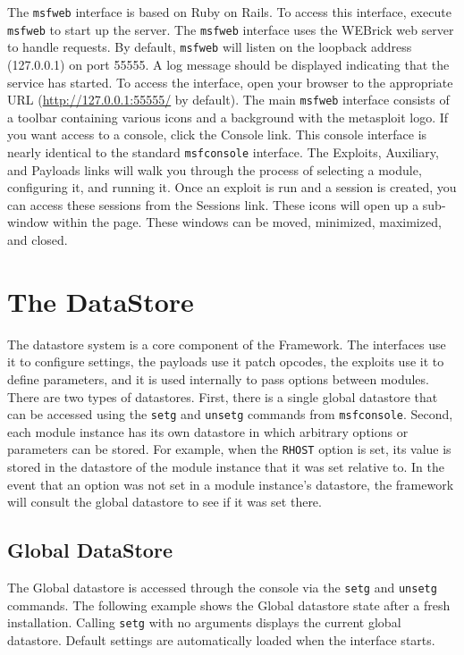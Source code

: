 \documentclass{report}
\begin{document}
\par
The \texttt{msfweb} interface is based on Ruby on Rails. To access this interface,
execute \texttt{msfweb} to start up the server. The \texttt{msfweb}
interface uses the WEBrick web server to handle requests. By default, \texttt{msfweb} will listen
on the loopback address (127.0.0.1) on port 55555. A log message should be displayed indicating that
the service has started. To access the interface, open your browser to the appropriate URL 
(\url{http://127.0.0.1:55555/} by default). The main \texttt{msfweb} interface consists of a toolbar
containing various icons and a background with the metasploit logo. If you want access to a console, 
click the Console link. This console interface is nearly identical to the standard 
\texttt{msfconsole} interface. The Exploits, Auxiliary, and Payloads links will walk you through 
the process of selecting a module, configuring it, and running it. Once an exploit is run and
a session is created, you can access these sessions from the Sessions link. These icons will open up
a sub-window within the page. These windows can be moved, minimized, maximized, and closed.

\pagebreak
\chapter{The DataStore}

\par
The datastore system is a core component of the Framework.  The interfaces use
it to configure settings, the payloads use it patch opcodes, the exploits
use it to define parameters, and it is used internally to pass options between
modules.  There are two types of datastores.  First, there is a single global
datastore that can be accessed using the \texttt{setg} and \texttt{unsetg}
commands from \texttt{msfconsole}.  Second, each module instance has its own
datastore in which arbitrary options or parameters can be stored.  For
example, when the \texttt{RHOST} option is set, its value is stored in the
datastore of the module instance that it was set relative to.  In the event
that an option was not set in a module instance's datastore, the framework
will consult the global datastore to see if it was set there.

    \section{Global DataStore}
    \label{ENV-GLOBAL}
\par
The Global datastore is accessed through the console via the \texttt{setg} and
\texttt{unsetg} commands. The following example shows the Global datastore
state after a fresh installation. Calling \texttt{setg} with no arguments
displays the current global datastore. Default settings are automatically
loaded when the interface starts.
\end{document}
